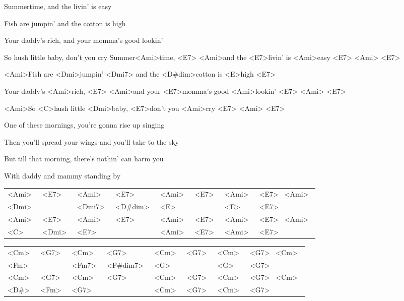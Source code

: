 

\ifdefined\TPBAND
\zs
Summertime,  and the livin' is easy

Fish are jumpin' and the cotton is high
 
Your daddy's rich, and your momma's good lookin'

So hush little baby, don't you cry
\ks
\else
\zs
Summer<Ami>time, <E7> <Ami>and the <E7>livin' is 
<Ami>easy <E7> <Ami> <E7>

<Ami>Fish are <Dmi>jumpin' <Dmi7> and the <D#dim>cotton is 
<E>high <E7>
 
Your daddy's <Ami>rich, <E7> <Ami>and your <E7>momma's 
good <Ami>lookin' <E7> <Ami> <E7>

<Ami>So <C>hush little <Dmi>baby, <E7>don't you 
<Ami>cry <E7> <Ami> <E7>
\ks
\fi

\zs
One of these mornings, you're gonna rise up singing

Then you'll spread your wings and you'll take to the sky

But till that morning, there's nothin' can harm you

With daddy and mammy standing by
\ks

\ifdefined\TPBAND
	
	\begin{table}[h]
	\begin{tabular}{|ll|ll|ll|ll|}
<Ami>~ & <E7>~ & <Ami>~ & <E7>~ & <Ami>~ 
& <E7>~ & <Ami>~ & <E7>~ <Ami>~	\\
<Dmi>~ & & <Dmi7>~ & <D#dim>~ & <E>~ 
& & <E>~ & <E7>~ 	\\
<Ami>~ & <E7>~ & <Ami>~ & <E7>~ & <Ami>~ 
& <E7>~ & <Ami>~ & <E7>~ <Ami>~ 	\\
 <C>~ & <Dmi>~ & <E7>~ 
 & & <Ami>~ & <E7>~ & <Ami>~ 
 & <E7>~ \\
	\end{tabular}
	\end{table}

\begin{table}[h]
\begin{tabular}{|ll|ll|ll|ll|}
<Cm>~ & <G7>~   & <Cm>~   & <G7>~          & <Cm>~ & <G7>~ & <Cm>~ & <G7>~  <Cm>~\\
<Fm>~ &                      & <Fm7>~ & <F#dim7>~       & <G>~   &                   & <G>~   & <G7>~  \\
<Cm>~ & <G7>~   & <Cm>~   & <G7>~          & <Cm>~ & <G7>~ & <Cm>~ & <G7>~  <Cm>~\\
<D#>~    & <Fm>~    & <G7>~     &               & <Cm>~ & <G7>~ & <Cm>~ & <G7>~  \\
\end{tabular}
\end{table}
	\fi
\kp
